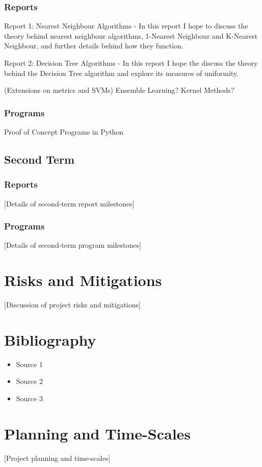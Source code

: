 \documentclass[a4paper,12pt]{article}
\begin{document}
\subsubsection{Reports}
Report 1: Nearest Neighbour Algorithms - In this report I hope to discuss the theory behind nearest neighbour algorithms, 1-Nearest Neighbour and K-Nearest Neighbour, and further details behind how they function. \par 
Report 2: Decision Tree Algorithms - In this report I hope the discuss the theory behind the Decision Tree algorithm and explore its measures of uniformity. \par
(Extensions on metrics and SVMs) Ensemble Learning? Kernel Methods?

\subsubsection{Programs}
Proof of Concept Programs in Python

\subsection{Second Term}
\subsubsection{Reports}
[Details of second-term report milestones]

\subsubsection{Programs}
[Details of second-term program milestones]

\section{Risks and Mitigations}
[Discussion of project risks and mitigations]

\section{Bibliography}
\begin{itemize}
  \item Source 1
  \item Source 2
  \item Source 3
\end{itemize}

\section{Planning and Time-Scales}
[Project planning and time-scales]
\end{document}
